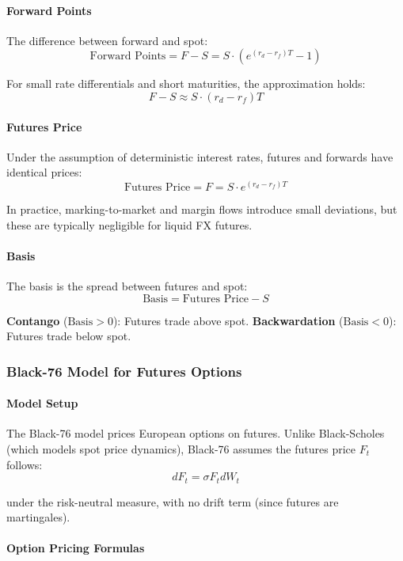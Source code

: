 \paragraph{Forward Points}

The difference between forward and spot:
\[
\text{Forward Points} = F - S = S \cdot \left( e^{(r_d - r_f) T} - 1 \right)
\]

For small rate differentials and short maturities, the approximation holds:
\[
F - S \approx S \cdot (r_d - r_f) T
\]

\paragraph{Futures Price}

Under the assumption of deterministic interest rates, futures and forwards have identical prices:
\[
\text{Futures Price} = F = S \cdot e^{(r_d - r_f) T}
\]

In practice, marking-to-market and margin flows introduce small deviations, but these are typically negligible for liquid FX futures.

\paragraph{Basis}

The basis is the spread between futures and spot:
\[
\text{Basis} = \text{Futures Price} - S
\]

\textbf{Contango} ($\text{Basis} > 0$): Futures trade above spot.
\textbf{Backwardation} ($\text{Basis} < 0$): Futures trade below spot.

\subsubsection{Black-76 Model for Futures Options}

\paragraph{Model Setup}

The Black-76 model prices European options on futures. Unlike Black-Scholes (which models spot price dynamics), Black-76 assumes the futures price $F_t$ follows:
\[
dF_t = \sigma F_t dW_t
\]

under the risk-neutral measure, with no drift term (since futures are martingales).

\paragraph{Option Pricing Formulas}

